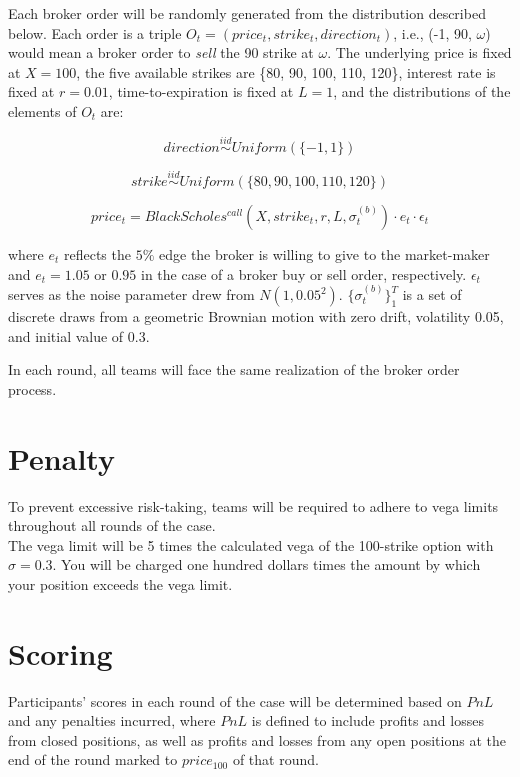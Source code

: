 \documentclass{amsart}
\renewcommand{\_}[1]{\underline{ #1 }}
\theoremstyle{definition}
\numberwithin{equation}{subsection}
\begin{document}
Each broker order will be randomly generated from the distribution described below. Each order is a triple $O_t=(price_t, strike_t, direction_t)$, i.e., (-1, 90, $\omega$) would mean a broker order to {\it sell} the 90 strike at $\omega$. The underlying price is fixed at $X=100$, the five available strikes are \{80, 90, 100, 110, 120\}, interest rate is fixed at $r=0.01$, time-to-expiration is fixed at $L=1$, and the distributions of the elements of $O_t$ are:

$$direction \overset{iid}{\sim} Uniform(\{-1,1\})$$

$$strike \overset{iid}{\sim} Uniform(\{80,90,100,110,120\})$$

$$price_t=BlackScholes^{call}(X,strike_t,r,L,\sigma_t^{(b)})\cdot e_t\cdot \epsilon_t$$

where $e_t$ reflects the $5\%$ edge the broker is willing to give to the market-maker and $e_t=1.05$ or $0.95$ in the case of a broker buy or sell order, respectively. $\epsilon_t$ serves as the noise parameter drew from $N(1,0.05^2)$.
$\{\sigma_t^{(b)}\}_1^T $ is a set of discrete draws from a geometric Brownian motion with zero drift, volatility 0.05, and initial value of 0.3. 


In each round, all teams will face the same realization of the broker order process. 

\section{Penalty}
To prevent excessive risk-taking, teams will be required to adhere to vega limits throughout all rounds of the case. 
\\

The vega limit will be 5 times the calculated vega of the 100-strike option with $\sigma = 0.3$. You will be charged one hundred dollars times the amount by which your position exceeds the vega limit. 

\section{Scoring}

Participants' scores in each round of the case will be determined based on $PnL$ and any penalties incurred, where $PnL$ is defined to include profits and losses from closed positions, as well as profits and losses from any open positions at the end of the round marked to $price_{100}$ of that round. 
\\
\end{document}
